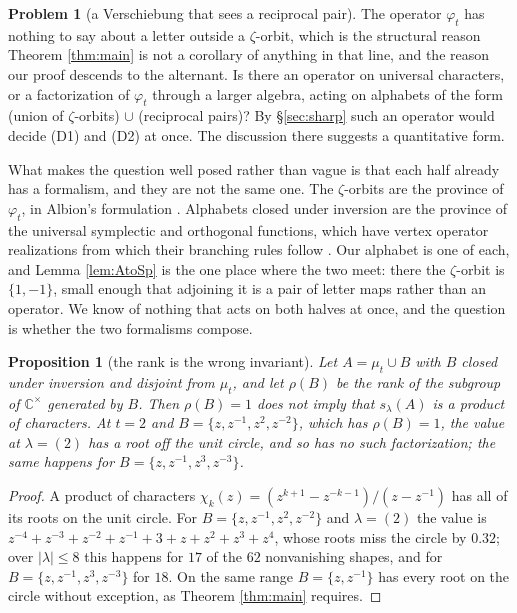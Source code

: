 \documentclass[11pt,reqno]{amsart}
\theoremstyle{plain}
\newtheorem{proposition}[theorem]{Proposition}
\theoremstyle{definition}
\newtheorem{problem}[theorem]{Problem}
\newcommand{\CC}{\mathbb{C}}
\newcommand{\zt}{\mu_t}
\begin{document}
\begin{problem}[a Verschiebung that sees a reciprocal pair]\label{prob:versch}
The operator $\varphi_t$ has nothing to say about a letter outside a $\zeta$-orbit, which is the
structural reason Theorem \ref{thm:main} is not a corollary of anything in that line, and the reason
our proof descends to the alternant. Is there an operator on universal characters, or a
factorization of $\varphi_t$ through a larger algebra, acting on alphabets of the form (union of
$\zeta$-orbits) $\cup$ (reciprocal pairs)? By \S\ref{sec:sharp} such an operator would decide (D1)
and (D2) at once. The discussion there suggests a quantitative form.

What makes the question well posed rather than vague is that each half already has a formalism, and
they are not the same one. The $\zeta$-orbits are the province of $\varphi_t$, in Albion's
formulation \cite{Alb23}. Alphabets closed under inversion are the province of the universal
symplectic and orthogonal functions, which have vertex operator realizations from which their
branching rules follow \cite{JJLW24}. Our alphabet is one of each, and Lemma \ref{lem:AtoSp} is the
one place where the two meet: there the $\zeta$-orbit is $\{1,-1\}$, small enough that adjoining it
is a pair of letter maps rather than an operator. We know of nothing that acts on both halves at
once, and the question is whether the two formalisms compose.
\end{problem}

\begin{proposition}[the rank is the wrong invariant]\label{conj:rank}
Let $A=\zt\cup B$ with $B$ closed under inversion and disjoint from $\zt$, and let $\rho(B)$ be the
rank of the subgroup of $\CC^{\times}$ generated by $B$. Then $\rho(B)=1$ does not imply that
$s_\lambda(A)$ is a product of characters. At $t=2$ and $B=\{z,z^{-1},z^{2},z^{-2}\}$, which has
$\rho(B)=1$, the value at $\lambda=(2)$ has a root off the unit circle, and so has no such
factorization; the same happens for $B=\{z,z^{-1},z^{3},z^{-3}\}$.
\end{proposition}

\begin{proof}
A product of characters $\chi_k(z)=(z^{k+1}-z^{-k-1})/(z-z^{-1})$ has all of its roots on the unit
circle. For $B=\{z,z^{-1},z^{2},z^{-2}\}$ and $\lambda=(2)$ the value is
$z^{-4}+z^{-3}+z^{-2}+z^{-1}+3+z+z^{2}+z^{3}+z^{4}$, whose roots miss the circle by $0.32$; over
$|\lambda|\le8$ this happens for $17$ of the $62$ nonvanishing shapes, and for
$B=\{z,z^{-1},z^{3},z^{-3}\}$ for $18$. On the same range $B=\{z,z^{-1}\}$ has every root on the
circle without exception, as Theorem \ref{thm:main} requires.
\end{proof}
\end{document}
